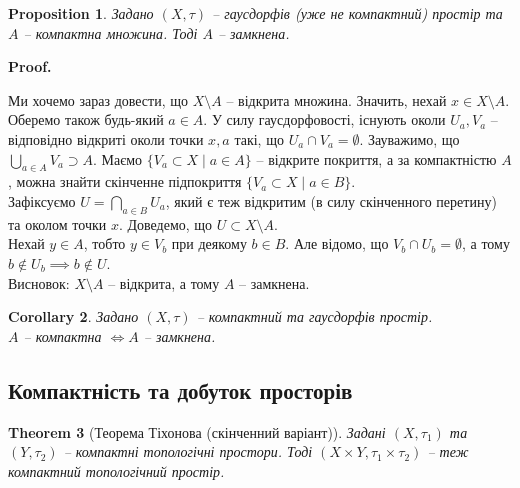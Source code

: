 \documentclass[a4paper, 10pt]{article}
\makeatletter
\theoremstyle{theoremdd}
\newtheorem{theorem}{Theorem}[subsection]
\newtheorem{proposition}[theorem]{Proposition}
\newtheorem{corollary}[theorem]{Corollary}
\renewenvironment{proof}[1][Proof.\\]{\par
\pushQED{\hfill \qed}%
\normalfont \topsep6\p@\@plus6\p@\relax
\trivlist
\item\relax
{\bfseries
#1\@addpunct{.}}\hspace\labelsep\ignorespaces
}{%
\popQED\endtrivlist\@endpefalse
}
\makeatother
\begin{document}
\begin{proposition}
Задано $(X,\tau)$ -- гаусдорфів (уже не компактний) простір та $A$ -- компактна множина. Тоді $A$ -- замкнена.
\end{proposition}

\begin{proof}
Ми хочемо зараз довести, що $X \setminus A$ -- відкрита множина. Значить, нехай $x \in X \setminus A$. Оберемо також будь-який $a \in A$. У силу гаусдорфовості, існують околи $U_a,V_a$ -- відповідно відкриті околи точки $x,a$ такі, що $U_a \cap V_a = \emptyset$. Зауважимо, що $\displaystyle\bigcup_{a \in A} V_a \supset A$. Маємо $\{V_a \subset X\mid a \in A\}$ -- відкрите покриття, а за компактністю $A$, можна знайти скінченне підпокриття $\{V_a \subset X\mid a \in B\}$.\\
Зафіксуємо $U = \displaystyle\bigcap_{a \in B} U_a$, який є теж відкритим (в силу скінченного перетину) та околом точки $x$. Доведемо, що $U \subset X \setminus A$.\\
Нехай $y \in A$, тобто $y \in V_b$ при деякому $b \in B$. Але відомо, що $V_b \cap U_b = \emptyset$, а тому $b \notin U_b \implies b \notin U$.\\
Висновок: $X \setminus A$ -- відкрита, а тому $A$ -- замкнена.
\end{proof}

\begin{corollary}
Задано $(X,\tau)$ -- компактний та гаусдорфів простір.\\
$A$ -- компактна $\iff A$ -- замкнена.
\end{corollary}

\subsection{Компактність та добуток просторів}
\begin{theorem}[Теорема Тіхонова (скінченний варіант)]
Задані $(X,\tau_1)$ та $(Y,\tau_2)$ -- компактні топологічні простори. Тоді $(X \times Y, \tau_1 \times \tau_2)$ -- теж компактний топологічний простір.
\end{theorem}
\end{document}

